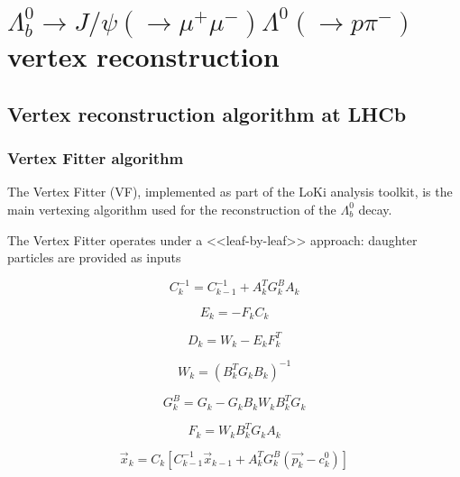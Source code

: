 \chapter{\texorpdfstring{$\Lambda_b^0 \rightarrow J/\psi (\rightarrow \mu^+ \mu^-) \Lambda^0 (\rightarrow p\pi^-)$}{Lambdab to JPsi Lambda} vertex reconstruction}
\label{cap:vertex_reconstruction}

\section{Vertex reconstruction algorithm at LHCb}
\subsection{Vertex Fitter algorithm}
The Vertex Fitter (VF), implemented as part of the LoKi analysis toolkit, is the main vertexing algorithm used for the reconstruction of the $\Lambda_b^0$ decay.

The Vertex Fitter operates under a <<leaf-by-leaf>> approach: daughter particles are provided as inputs

\begin{equation}
C_k^{-1} = C_{k-1}^{-1} + A_k^T G_k^B A_k
\end{equation}

\begin{equation}
E_k = -F_k C_k
\end{equation}

\begin{equation}
D_k = W_k - E_k F_k^T
\end{equation}

\begin{equation}
W_k = {\left(B_k^T G_k B_k\right)}^{-1}
\end{equation}

\begin{equation}
G_k^B = G_k - G_k B_k W_k B_k^T G_k
\end{equation}

\begin{equation}
F_k = W_k B_k^T G_k A_k
\end{equation}

\begin{equation}
\vec{x}_k = C_k \left[
	C_{k-1}^{-1} \vec{x}_{k-1}
	+
	A_k^T G_k^B \left(
		\vec{p_k} - c_k^0	
	\right)
\right]
\end{equation}

